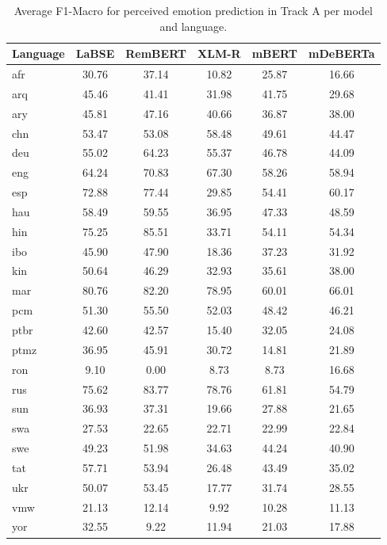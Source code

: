 \begin{table*}[t]
\centering
\begin{tabular}{lccccc}
\toprule
Language & LaBSE & RemBERT & XLM-R & mBERT & mDeBERTa \\
\midrule
afr & 30.76 & 37.14 & 10.82 & 25.87 & 16.66 \\
arq & 45.46 & 41.41 & 31.98 & 41.75 & 29.68 \\
ary & 45.81 & 47.16 & 40.66 & 36.87 & 38.00 \\
chn & 53.47 & 53.08 & 58.48 & 49.61 & 44.47 \\
deu & 55.02 & 64.23 & 55.37 & 46.78 & 44.09 \\
eng & 64.24 & 70.83 & 67.30 & 58.26 & 58.94 \\
esp & 72.88 & 77.44 & 29.85 & 54.41 & 60.17 \\
hau & 58.49 & 59.55 & 36.95 & 47.33 & 48.59 \\
hin & 75.25 & 85.51 & 33.71 & 54.11 & 54.34 \\
ibo & 45.90 & 47.90 & 18.36 & 37.23 & 31.92 \\
kin & 50.64 & 46.29 & 32.93 & 35.61 & 38.00 \\
mar & 80.76 & 82.20 & 78.95 & 60.01 & 66.01 \\
pcm & 51.30 & 55.50 & 52.03 & 48.42 & 46.21 \\
ptbr & 42.60 & 42.57 & 15.40 & 32.05 & 24.08 \\
ptmz & 36.95 & 45.91 & 30.72 & 14.81 & 21.89 \\
ron & 9.10 & 0.00 & 8.73 & 8.73 & 16.68 \\
rus & 75.62 & 83.77 & 78.76 & 61.81 & 54.79 \\
sun & 36.93 & 37.31 & 19.66 & 27.88 & 21.65 \\
swa & 27.53 & 22.65 & 22.71 & 22.99 & 22.84 \\
swe & 49.23 & 51.98 & 34.63 & 44.24 & 40.90 \\
tat & 57.71 & 53.94 & 26.48 & 43.49 & 35.02 \\
ukr & 50.07 & 53.45 & 17.77 & 31.74 & 28.55 \\
vmw & 21.13 & 12.14 & 9.92 & 10.28 & 11.13 \\
yor & 32.55 & 9.22 & 11.94 & 21.03 & 17.88 \\
\bottomrule
\end{tabular}
\caption{Average F1-Macro for perceived emotion prediction in Track A per model and language.}
\label{tab:main_results_track_a_lms}
\end{table*}